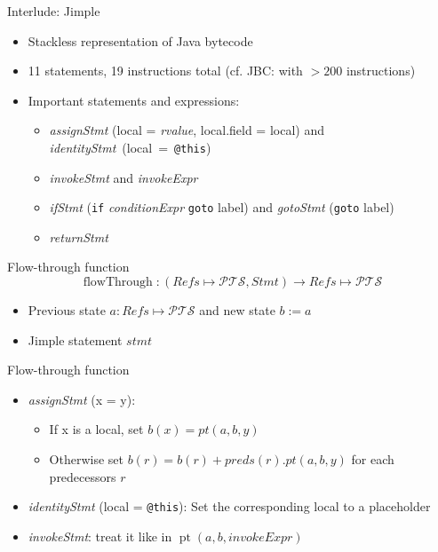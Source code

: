 \documentclass{beamer}
\begin{document}
\begin{frame}{Interlude: Jimple}
\begin{itemize}
    \item Stackless representation of Java bytecode
    \item 11 statements, 19 instructions total (cf. JBC: with $>200$ instructions)
    \item Important statements and expressions:
    \begin{itemize}
        \item \emph{assignStmt} (local = \emph{rvalue}, local.field = local) and \emph{identityStmt}~(local~=~\texttt{@this})
        \item \emph{invokeStmt} and \emph{invokeExpr}
        \item \emph{ifStmt} (\texttt{if} \emph{conditionExpr} \texttt{goto} label)  and \emph{gotoStmt} (\texttt{goto} label)
        \item \emph{returnStmt}
    \end{itemize}
\end{itemize}
\end{frame}

\begin{frame}{Flow-through function}
\[ \operatorname{flowThrough} : (\mathit{Refs} \mapsto \mathcal{PTS}, \mathit{Stmt}) \to \mathit{Refs} \mapsto \mathcal{PTS} \]
\begin{itemize}
\item Previous state $a : \mathit{Refs} \mapsto \mathcal{PTS}$ and new state $b := a$
\item Jimple statement $stmt$
\end{itemize}
\begin{block}{Flow-through function}
\begin{itemize}
\item \emph{assignStmt} (x = y): 
\begin{itemize}
\item If x is a local, set $b(x) = pt(a,b,y)$
\item Otherwise set $b(r) = b(r) + preds(r).pt(a,b,y)$ for each predecessors $r$
\end{itemize}
\item \emph{identityStmt} (local = \texttt{@this}): Set the corresponding local to a placeholder
\item \emph{invokeStmt}: treat it like in $\operatorname{pt}(a,b,invokeExpr)$
\end{itemize}
\end{block}
\end{frame}
\end{document}
